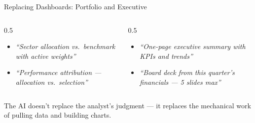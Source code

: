 \documentclass[aspectratio=169]{beamer}
\begin{document}
\begin{frame}{Replacing Dashboards: Portfolio and Executive}
\begin{columns}[T]
\begin{column}{0.5\textwidth}
\begin{shadedbox}[title=\textbf{Portfolio Management}]
\begin{itemize}\small
  \item \textit{``Sector allocation vs.\ benchmark with active weights''}
  \item \textit{``Performance attribution --- allocation vs.\ selection''}
\end{itemize}
\end{shadedbox}
\end{column}
\begin{column}{0.5\textwidth}
\begin{shadedbox}[title=\textbf{Executive Reporting}]
\begin{itemize}\small
  \item \textit{``One-page executive summary with KPIs and trends''}
  \item \textit{``Board deck from this quarter's financials --- 5 slides max''}
\end{itemize}
\end{shadedbox}
\end{column}
\end{columns}
\vspace{0.3cm}
The AI doesn't replace the analyst's judgment --- it replaces the \alert{mechanical work} of pulling data and building charts.
\end{frame}
\end{document}
